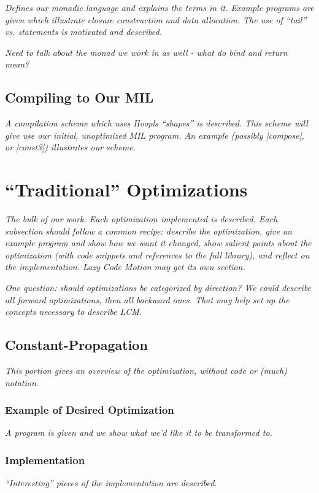 \documentclass[12pt]{report}
\begin{document}
\emph{Defines our monadic language and explains the terms in
  it. Example programs are given which illustrate closure construction
  and data allocation. The use of ``tail'' vs. statements is motivated
  and described. }

\emph{Need to talk about the monad we work in as well - what 
do bind and return mean?}

\section{Compiling to Our MIL}
\emph{A compilation scheme which uses Hoopls ``shapes'' is
described. This scheme will give use our initial, unoptimized
MIL program. An example (possibly |compose|, or |const3|) illustrates 
our scheme.}

\chapter{``Traditional'' Optimizations}

\emph{The bulk of our work. Each optimization implemented is
  described. Each subsection should follow a common recipe: describe
  the optimization, give an example program and show how we want it
  changed, show salient points about the optimization (with code
  snippets and references to the full library), and reflect on the
  implementation.  Lazy Code Motion may get its own section.}

\emph{One question: should optimizations be categorized by direction? We could
describe all forward optimizations, then all backward ones. That may help
set up the concepts necessary to describe LCM.}

\section{Constant-Propagation}
\emph{This portion gives an overview of the optimization, without
code or (much) notation.}

\subsection{Example of Desired Optimization}
\emph{A program is given and we show what we'd like it to be
transformed to.}

\subsection{Implementation}
\emph{``Interesting'' pieces of the implementation are described.}
\end{document}

